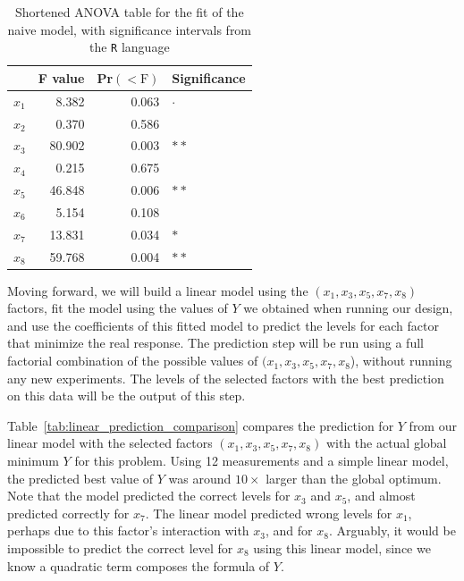 \documentclass[conference]{IEEEtran}
\begin{document}
\begin{table}[ht]
\centering
\caption{Shortened ANOVA table for the fit of the naive model, with significance intervals from the \texttt{R} language}
\label{tab:anova_linear}
\begingroup\small
\begin{tabular}{lrrl}
  \toprule
 & F value & Pr$(<\text{F})$ & Significance \\
  \midrule
$x_1$ & 8.382 & 0.063 & $\cdot$ \\
  $x_2$ & 0.370 & 0.586 &   \\
  $x_3$ & 80.902 & 0.003 & $**$ \\
  $x_4$ & 0.215 & 0.675 &   \\
  $x_5$ & 46.848 & 0.006 & $**$ \\
  $x_6$ & 5.154 & 0.108 &   \\
  $x_7$ & 13.831 & 0.034 & $*$ \\
  $x_8$ & 59.768 & 0.004 & $**$ \\
   \bottomrule
\end{tabular}
\endgroup
\end{table}

Moving forward, we will build a linear model using the \((x_1,x_3,x_5,x_7,x_8)\)
factors, fit the model using the values of \(Y\) we obtained when running our
design, and use the coefficients of this fitted model to predict the levels for
each factor that minimize the real response. The prediction step will be run
using a full factorial combination of the possible values of
\((x_1,x_3,x_5,x_7,x_8\)), without running any new experiments. The levels of the
selected factors with the best prediction on this data will be the output of
this step.

Table~\ref{tab:linear_prediction_comparison} compares the prediction for \(Y\)
from our linear model with the selected factors \((x_1,x_3,x_5,x_7,x_8)\) with the
actual global minimum \(Y\) for this problem. Using 12 measurements and a simple
linear model, the predicted best value of \(Y\) was around \(10\times\) larger than
the global optimum. Note that the model predicted the correct levels for \(x_3\)
and \(x_5\), and almost predicted correctly for \(x_7\). The linear model predicted
wrong levels for \(x_1\), perhaps due to this factor's interaction with \(x_3\), and
for \(x_8\). Arguably, it would be impossible to predict the correct level for
\(x_8\) using this linear model, since we know a quadratic term composes the
formula of \(Y\).
\end{document}
